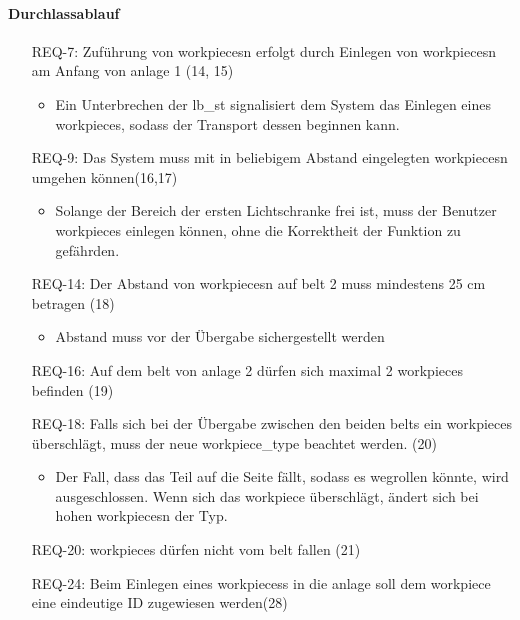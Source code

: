 \paragraph{Durchlassablauf}
\begin{itemize}
    \item[REQ-7:] Zuführung von \glspl{workpiece}n erfolgt durch Einlegen von \glspl{workpiece}n am Anfang von \gls{anlage} 1 (14, 15)
    \begin{itemize}
        \item Ein Unterbrechen der \gls{lb_st} signalisiert dem System das Einlegen eines \gls{workpiece}s,
        sodass der Transport dessen beginnen kann.
    \end{itemize}
    \item[REQ-9:] Das System muss mit in beliebigem Abstand eingelegten \glspl{workpiece}n umgehen können(16,17) %
    \begin{itemize}
        \item Solange der Bereich der ersten Lichtschranke frei ist, muss der Benutzer \glspl{workpiece}
        einlegen können, ohne die Korrektheit der Funktion zu gefährden.
    \end{itemize}
    \item[REQ-14:] Der Abstand von \glspl{workpiece}n auf \gls{belt} 2 muss mindestens 25 cm betragen (18)
    \begin{itemize}
        \item Abstand muss vor der Übergabe sichergestellt werden
    \end{itemize}
    \item[REQ-16:] Auf dem \gls{belt} von \gls{anlage} 2 dürfen sich maximal 2 \glspl{workpiece} befinden (19)
    \item[REQ-18:] Falls sich bei der Übergabe zwischen den beiden \glspl{belt} ein \glspl{workpiece}
    überschlägt, muss der neue \gls{workpiece_type} beachtet werden. (20)
    \begin{itemize}
        \item Der Fall, dass das Teil auf die Seite fällt, sodass es wegrollen könnte, wird ausgeschlossen.
        Wenn sich das \gls{workpiece} überschlägt, ändert sich bei hohen \glspl{workpiece}n der Typ.
    \end{itemize}
    \item[REQ-20:] \glspl{workpiece} dürfen nicht vom \gls{belt} fallen (21)
    \item[REQ-24:] Beim Einlegen eines \glspl{workpiece}s in die \gls{anlage} soll dem \gls{workpiece} eine eindeutige ID zugewiesen werden(28)

\end{itemize}
